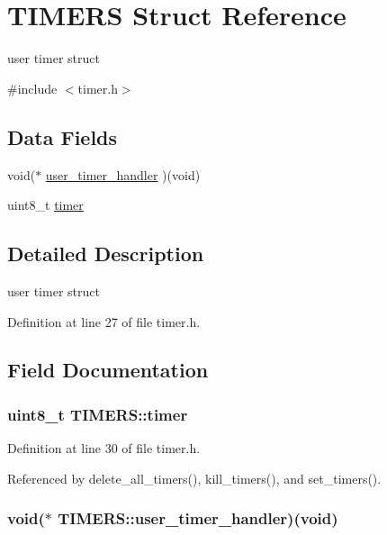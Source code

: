 \hypertarget{structTIMERS}{\section{T\-I\-M\-E\-R\-S Struct Reference}
\label{structTIMERS}
}


user timer struct  




{\ttfamily \#include $<$timer.\-h$>$}

\subsection*{Data Fields}
\begin{DoxyCompactItemize}
\item 
void($\ast$ \hyperlink{structTIMERS_a66bb89d328cf2c3f1b9362d7ea207c29}{user\-\_\-timer\-\_\-handler} )(void)
\item 
uint8\-\_\-t \hyperlink{structTIMERS_a0b10fdb7b0e6b1d3ca49718f47c4514d}{timer}
\end{DoxyCompactItemize}


\subsection{Detailed Description}
user timer struct 

Definition at line 27 of file timer.\-h.



\subsection{Field Documentation}
\hypertarget{structTIMERS_a0b10fdb7b0e6b1d3ca49718f47c4514d}{
\subsubsection[{timer}]{\setlength{\rightskip}{0pt plus 5cm}uint8\-\_\-t T\-I\-M\-E\-R\-S\-::timer}}\label{structTIMERS_a0b10fdb7b0e6b1d3ca49718f47c4514d}


Definition at line 30 of file timer.\-h.



Referenced by delete\-\_\-all\-\_\-timers(), kill\-\_\-timers(), and set\-\_\-timers().

\hypertarget{structTIMERS_a66bb89d328cf2c3f1b9362d7ea207c29}{
\subsubsection[{user\-\_\-timer\-\_\-handler}]{\setlength{\rightskip}{0pt plus 5cm}void($\ast$ T\-I\-M\-E\-R\-S\-::user\-\_\-timer\-\_\-handler)(void)}}\label{structTIMERS_a66bb89d328cf2c3f1b9362d7ea207c29}


